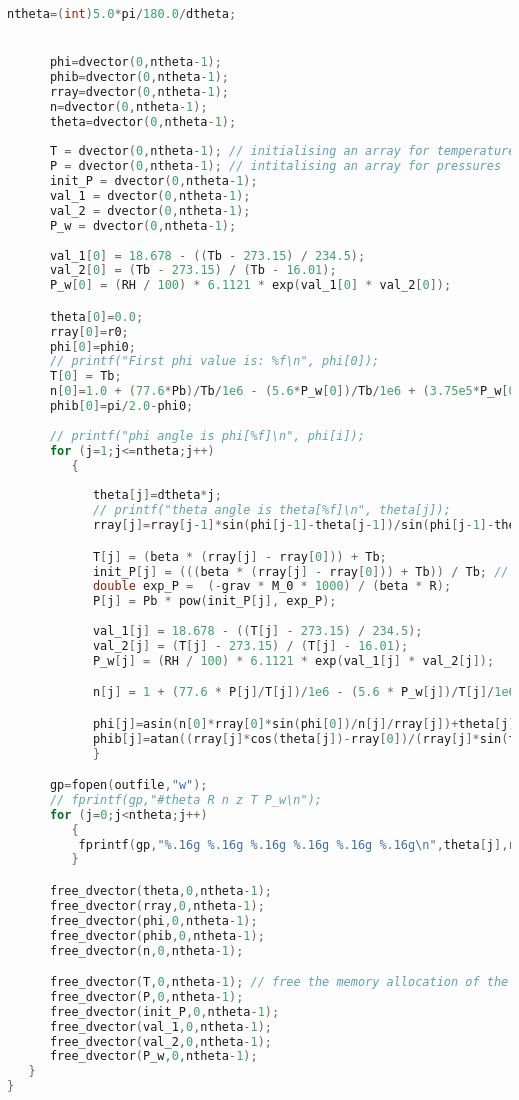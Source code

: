 \documentclass{article}
\begin{document}
\begin{footnotesize}
\begin{lstlisting}[language=c]
      ntheta=(int)5.0*pi/180.0/dtheta;


      phi=dvector(0,ntheta-1);
      phib=dvector(0,ntheta-1);
      rray=dvector(0,ntheta-1);
      n=dvector(0,ntheta-1);
      theta=dvector(0,ntheta-1);
     
      T = dvector(0,ntheta-1); // initialising an array for temperatures
      P = dvector(0,ntheta-1); // intitalising an array for pressures
      init_P = dvector(0,ntheta-1);
      val_1 = dvector(0,ntheta-1); 
      val_2 = dvector(0,ntheta-1);
      P_w = dvector(0,ntheta-1);
     
      val_1[0] = 18.678 - ((Tb - 273.15) / 234.5);
      val_2[0] = (Tb - 273.15) / (Tb - 16.01);
      P_w[0] = (RH / 100) * 6.1121 * exp(val_1[0] * val_2[0]);

      theta[0]=0.0;
      rray[0]=r0;
      phi[0]=phi0;
      // printf("First phi value is: %f\n", phi[0]);
      T[0] = Tb;
      n[0]=1.0 + (77.6*Pb)/Tb/1e6 - (5.6*P_w[0])/Tb/1e6 + (3.75e5*P_w[0])/pow(Tb, 2)/1e6;
      phib[0]=pi/2.0-phi0;
   
      // printf("phi angle is phi[%f]\n", phi[i]);
      for (j=1;j<=ntheta;j++)
         {
            
            theta[j]=dtheta*j;
            // printf("theta angle is theta[%f]\n", theta[j]);
            rray[j]=rray[j-1]*sin(phi[j-1]-theta[j-1])/sin(phi[j-1]-theta[j]);

            T[j] = (beta * (rray[j] - rray[0])) + Tb;
            init_P[j] = (((beta * (rray[j] - rray[0])) + Tb)) / Tb; // (in hPa)
            double exp_P =  (-grav * M_0 * 1000) / (beta * R);
            P[j] = Pb * pow(init_P[j], exp_P);
            
            val_1[j] = 18.678 - ((T[j] - 273.15) / 234.5);
            val_2[j] = (T[j] - 273.15) / (T[j] - 16.01);
            P_w[j] = (RH / 100) * 6.1121 * exp(val_1[j] * val_2[j]);

            n[j] = 1 + (77.6 * P[j]/T[j])/1e6 - (5.6 * P_w[j])/T[j]/1e6 + (3.75e5 * P_w[j])/pow(T[j], 2)/1e6;

            phi[j]=asin(n[0]*rray[0]*sin(phi[0])/n[j]/rray[j])+theta[j];
            phib[j]=atan((rray[j]*cos(theta[j])-rray[0])/(rray[j]*sin(theta[j]))); /* bhatdotrhatv */       
            }

      gp=fopen(outfile,"w");
      // fprintf(gp,"#theta R n z T P_w\n");
      for (j=0;j<ntheta;j++)
         {
          fprintf(gp,"%.16g %.16g %.16g %.16g %.16g %.16g\n",theta[j],rray[j],n[j],phi[j]-theta[j],T[j],P_w[j]);
         }

      free_dvector(theta,0,ntheta-1);
      free_dvector(rray,0,ntheta-1);
      free_dvector(phi,0,ntheta-1);
      free_dvector(phib,0,ntheta-1);
      free_dvector(n,0,ntheta-1);

      free_dvector(T,0,ntheta-1); // free the memory allocation of the T vector
      free_dvector(P,0,ntheta-1);
      free_dvector(init_P,0,ntheta-1);
      free_dvector(val_1,0,ntheta-1); 
      free_dvector(val_2,0,ntheta-1);
      free_dvector(P_w,0,ntheta-1);
   }
}

\end{lstlisting}
\end{footnotesize}
\end{document}
